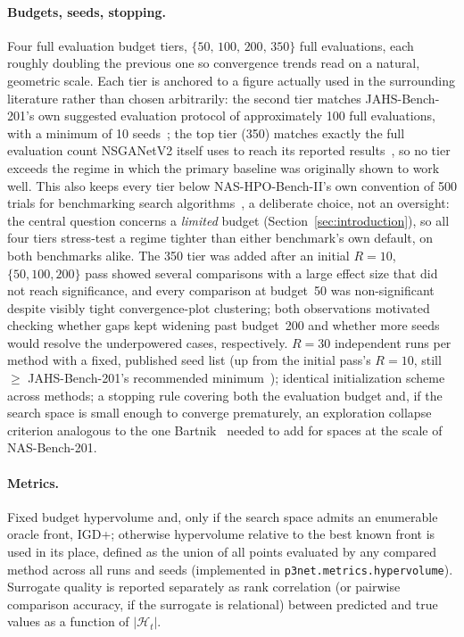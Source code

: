 \paragraph{Budgets, seeds, stopping.} Four full evaluation budget tiers, $\{50,\, 100,\, 200,\, 350\}$ full
evaluations, each roughly doubling the previous one so convergence trends read on a natural, geometric
scale. Each tier is anchored to a figure actually used in the surrounding literature rather than chosen
arbitrarily: the second tier matches JAHS-Bench-201's own suggested evaluation protocol of approximately 100
full evaluations, with a minimum of 10 seeds~\citep{bansal2022jahsbench}; the top tier (350) matches exactly
the full evaluation count NSGANetV2 itself uses to reach its reported results~\citep{lu2020nsganetv2}, so no
tier exceeds the regime in which the primary baseline was originally shown to work well. This also keeps
every tier below NAS-HPO-Bench-II's own convention of 500 trials for benchmarking search
algorithms~\citep{hirose2021nashpobenchii}, a deliberate choice, not an oversight: the central question
concerns a \emph{limited} budget (Section~\ref{sec:introduction}), so all four tiers stress-test a regime tighter than either
benchmark's own default, on both benchmarks alike. The 350 tier was added after an initial $R=10$,
$\{50,100,200\}$ pass showed several comparisons with a large effect size that did not reach significance, and every comparison at
budget~50 was non-significant despite visibly tight convergence-plot clustering; both observations motivated
checking whether gaps kept widening past budget~200 and whether more seeds would resolve the underpowered
cases, respectively. $R = 30$ independent runs per method with a fixed, published
seed list (up from the initial pass's $R=10$, still $\geq$ JAHS-Bench-201's recommended
minimum~\citep{bansal2022jahsbench}); identical
initialization scheme across methods; a stopping rule covering both the evaluation budget and, if the
search space is small enough to converge prematurely, an exploration collapse criterion analogous to the
one Bartnik~\citep{bartnik2026evolutionary} needed to add for spaces at the scale of NAS-Bench-201.

\paragraph{Metrics.} Fixed budget hypervolume and, only if the search space admits an enumerable oracle
front, IGD+; otherwise hypervolume relative to the best known front is used in its place, defined as the union of all points evaluated by any compared method across all runs and seeds (implemented in \texttt{p3net.metrics.hypervolume}). Surrogate quality
is reported separately as rank correlation (or pairwise comparison accuracy, if the surrogate is relational)
between predicted and true values as a function of $|\mathcal{H}_t|$.

